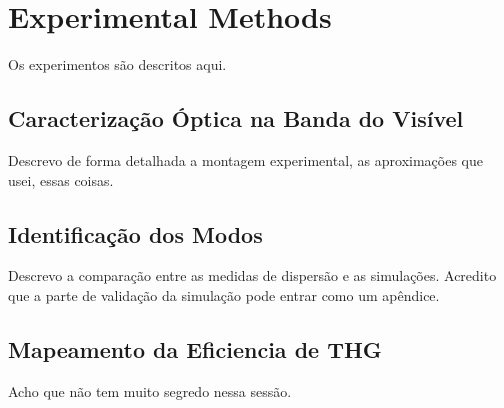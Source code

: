 \chapter{Experimental Methods}
Os experimentos são descritos aqui. 

\section{Caracterização Óptica na Banda do Visível}
Descrevo de forma detalhada a montagem experimental, as aproximações que usei, essas coisas. 

\section{Identificação dos Modos}
Descrevo a comparação entre as medidas de dispersão e as simulações. Acredito que a parte de validação da simulação pode entrar como um apêndice. 

\section{Mapeamento da Eficiencia de THG}
Acho que não tem muito segredo nessa sessão. 